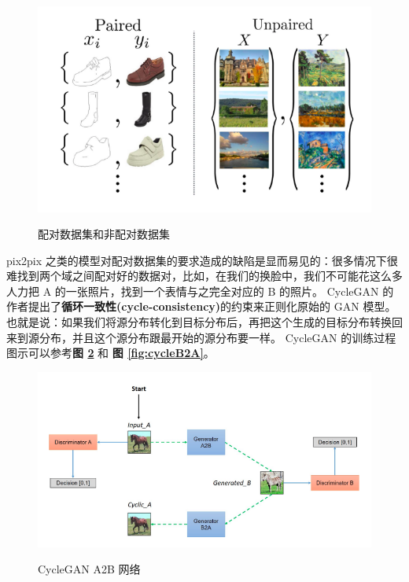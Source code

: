 \begin{figure}[h!]
	\caption{配对数据集和非配对数据集}
	\centering
	\includegraphics[width=\textwidth]{unpaired.png}
	\label{fig:unpaired}
\end{figure}

pix2pix 之类的模型对配对数据集的要求造成的缺陷是显而易见的：很多情况下很难找到两个域之间配对好的数据对，比如，在我们的换脸中，我们不可能花这么多人力把 A 的一张照片，找到一个表情与之完全对应的 B 的照片。
CycleGAN 的作者提出了\textbf{循环一致性(cycle-consistency)}的约束来正则化原始的 GAN 模型。
也就是说：如果我们将源分布转化到目标分布后，再把这个生成的目标分布转换回来到源分布，并且这个源分布跟最开始的源分布要一样。
CycleGAN 的训练过程图示可以参考\textbf{图 \ref{fig:cycleA2B}} 和 \textbf{图 \ref{fig:cycleB2A}}。

\begin{figure}[h!]
	\caption{CycleGAN A2B 网络}
	\centering
	\includegraphics[width=\textwidth]{cycleA2B.png}
	\label{fig:cycleA2B}
\end{figure}

